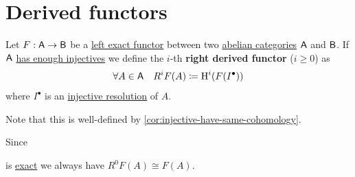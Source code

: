 \documentclass[../../../main]{subfiles}
\begin{document}
\section{Derived functors}

\begin{definition} \label{def:right-derived-functor}
  Let \(F: \mathsf{A} \to \mathsf{B}\) be a \hyperref[def:exact-complex-functor]{left exact functor} between two \hyperref[def:abelian-category]{abelian categories} \(\mathsf{A}\) and \(\mathsf{B}\).
  If \(\mathsf{A}\) \hyperref[def:enough-injectives-projectives]{has enough injectives} we define the \(i\)-th \textbf{right derived functor} (\(i \geq 0\)) as
  \begin{equation*}
    \forall A \in \mathsf{A} \quad R^{i}F (A) \coloneq \operatorname{H}^{i}(F(I^{\bullet}))
  \end{equation*}
  where \(I^{\bullet}\) is an \hyperref[def:injective-projective-resolution]{injective resolution} of \(A\).

  Note that this is well-defined by \autoref{cor:injective-have-same-cohomology}.
\end{definition}

\begin{remark}
  Since
  \begin{center}
  \end{center}
  is \hyperref[def:short-exact-sequence]{exact} we always have \(R^{0}F(A) \cong F(A)\).
\end{remark}
\end{document}
